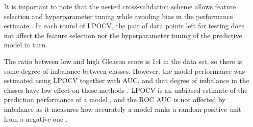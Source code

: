 It is important to note that the nested cross-validation scheme allows feature
selection and hyperparameter tuning while avoiding bias in the performance
estimate \citep{Varma2006}. In each round of LPOCV, the pair of data points left
for testing does not affect the feature selection nor the hyperparameter tuning
of the predictive model in turn.

The ratio between low and high Gleason score is 1:4 in the data set, so there is
some degree of imbalance between classes. However, the model performance was
estimated using LPOCV together with AUC, and that degree of imbalance in the
classes have low effect on these methods \citep{Airola2011, Smith2014}. LPOCV is
an unbiased estimate of the prediction performance of a model
\citep{Airola2011}, and the ROC AUC is not affected by imbalance as it measures
how accurately a model ranks a random positive unit from a negative one
\citep{Fawcett2006}.

